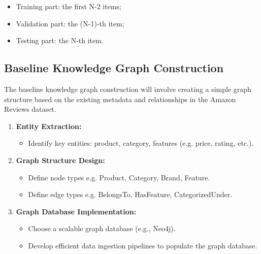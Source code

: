 \documentclass{article}
\begin{document}
\begin{enumerate}
\begin{itemize}
        \begin{itemize}
            \item Training part: the first N-2 items;
            \item Validation part: the (N-1)-th item;
            \item Testing part: the N-th item.
        \end{itemize}
        \end{itemize}
        


    
\end{enumerate}

\subsection{Baseline Knowledge Graph Construction}
The baseline knowledge graph construction will involve creating a simple graph structure based on the existing metadata and relationships in the Amazon Reviews dataset.
\begin{enumerate}
    \item \textbf{Entity Extraction:}
    \begin{itemize}
        \item Identify key entities: product, category, features (e.g. price, rating, etc.). 
    \end{itemize}
    
    \item \textbf{Graph Structure Design:}
    \begin{itemize}
        \item Define node types e.g. Product, Category, Brand, Feature.
        \item Define edge types e.g. BelongsTo, HasFeature, CategorizedUnder.
    \end{itemize}
    
    \item \textbf{Graph Database Implementation:}
    \begin{itemize}
        \item Choose a scalable graph database (e.g., Neo4j).
        \item Develop efficient data ingestion pipelines to populate the graph database.
    \end{itemize}
\end{enumerate}
\end{document}
